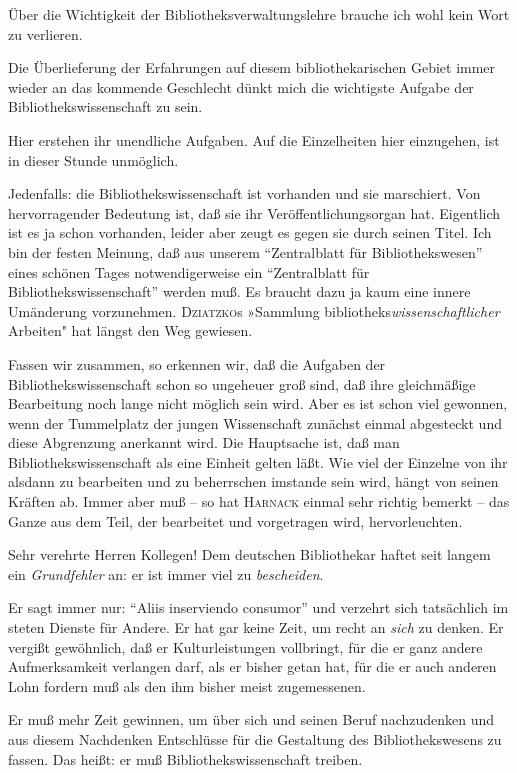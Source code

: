 \documentclass[a4paper,
fontsize=11pt,
oneside,
numbers=noperiodatend,
parskip=half-,
bibliography=totoc,
final
]{scrartcl}
\begin{document}
Über die Wichtigkeit der Bibliotheksverwaltungslehre brauche ich wohl
kein Wort zu verlieren.

Die Überlieferung der Erfahrungen auf diesem bibliothekarischen Gebiet
immer wieder an das kommende Geschlecht dünkt mich die wichtigste
Aufgabe der Bibliothekswissenschaft zu sein.

Hier erstehen ihr unendliche Aufgaben. Auf die Einzelheiten hier
einzugehen, ist in dieser Stunde unmöglich.

Jedenfalls: die Bibliothekswissenschaft ist vorhanden und sie
marschiert. Von hervorragender Bedeutung ist, daß sie ihr
Veröffentlichungsorgan hat. Eigentlich ist es ja schon vorhanden, leider
aber zeugt es gegen sie durch seinen Titel. Ich bin der festen Meinung,
daß aus unserem \enquote{Zentralblatt für Bibliothekswesen} eines
schönen Tages notwendigerweise ein \enquote{Zentralblatt für
Bibliothekswissenschaft} werden muß. Es braucht dazu ja kaum eine innere
Umänderung vorzunehmen. \textsc{Dziatzko}s »Sammlung
bibliotheks\emph{wissenschaftlicher} Arbeiten" hat längst den Weg
gewiesen.

Fassen wir zusammen, so erkennen wir, daß die Aufgaben der
Bibliothekswissenschaft schon so ungeheuer groß sind, daß ihre
gleichmäßige Bearbeitung noch lange nicht möglich sein wird. Aber es ist
schon viel gewonnen, wenn der Tummelplatz der jungen Wissenschaft
zunächst einmal abgesteckt und diese Abgrenzung anerkannt wird. Die
Hauptsache ist, daß man Bibliothekswissenschaft als eine Einheit gelten
läßt. Wie viel der Einzelne von ihr alsdann zu bearbeiten und zu
beherrschen imstande sein wird, hängt von seinen Kräften ab. Immer aber
muß -- so hat \textsc{Harnack} einmal sehr richtig bemerkt -- das Ganze
aus dem Teil, der bearbeitet und vorgetragen wird, hervorleuchten.

Sehr verehrte Herren Kollegen! Dem deutschen Bibliothekar haftet seit
langem ein \emph{Grundfehler} an: er ist immer viel zu
\emph{bescheiden}.

Er sagt immer nur: \enquote{Aliis inserviendo consumor} und verzehrt
sich tatsächlich im steten Dienste für Andere. Er hat gar keine Zeit, um
recht an \emph{sich} zu denken. Er vergißt gewöhnlich, daß er
Kulturleistungen vollbringt, für die er ganz andere Aufmerksamkeit
verlangen darf, als er bisher getan hat, für die er auch anderen Lohn
fordern muß als den ihm bisher meist zugemessenen.

Er muß mehr Zeit gewinnen, um über sich und seinen Beruf nachzudenken
und aus diesem Nachdenken Entschlüsse für die Gestaltung des
Bibliothekswesens zu fassen. Das heißt: er muß Bibliothekswissenschaft
treiben.
\end{document}
